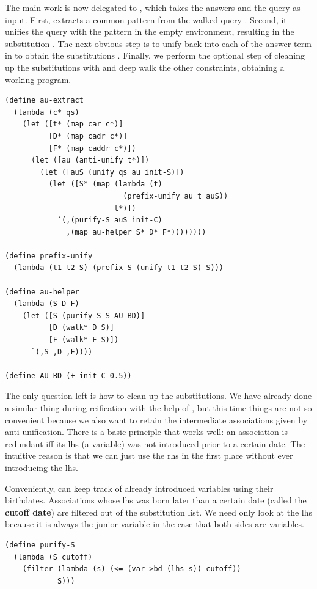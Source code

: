 The main work is now delegated to , which takes the answers and the query as input. First,  extracts a common pattern  from the walked query . Second, it unifies the query with the pattern in the empty environment, resulting in the substitution . The next obvious step is to unify  back into each of the answer term in  to obtain the substitutions . Finally, we perform the optional step of cleaning up the substitutions with  and deep walk the other constraints, obtaining a working program.
\begin{lstlisting}
(define au-extract
  (lambda (c* qs)
    (let ([t* (map car c*)]
          [D* (map cadr c*)]
          [F* (map caddr c*)])
      (let ([au (anti-unify t*)])
        (let ([auS (unify qs au init-S)])
          (let ([S* (map (lambda (t)
                           (prefix-unify au t auS))
                         t*)])
            `(,(purify-S auS init-C)
              ,(map au-helper S* D* F*))))))))

(define prefix-unify
  (lambda (t1 t2 S) (prefix-S (unify t1 t2 S) S)))

(define au-helper
  (lambda (S D F)
    (let ([S (purify-S S AU-BD)]
          [D (walk* D S)]
          [F (walk* F S)])
      `(,S ,D ,F))))

(define AU-BD (+ init-C 0.5))
\end{lstlisting}

The only question left is how to clean up the substitutions. We have already done a similar thing during reification with the help of , but this time things are not so convenient because we also want to retain the intermediate associations given by anti-unification. There is a basic principle that works well: an association is redundant iff its lhs (a variable) was not introduced prior to a certain date. The intuitive reason is that we can just use the rhs in the first place without ever introducing the lhs.

Conveniently,  can keep track of already introduced variables using their birthdates. Associations whose lhs was born later than a certain date (called the \textbf{cutoff date}) are filtered out of the substitution list. We need only look at the lhs because it is always the junior variable in the case that both sides are variables.
\begin{lstlisting}
(define purify-S
  (lambda (S cutoff)
    (filter (lambda (s) (<= (var->bd (lhs s)) cutoff))
            S)))
\end{lstlisting}

